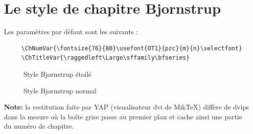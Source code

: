 \documentclass{report}
\begin{document}
    \section{Le style de chapitre Bjornstrup}
    Les paramètres par défaut sont les suivants :
    {\small\begin{verbatim}
     \ChNumVar{\fontsize{76}{80}\usefont{OT1}{pzc}{m}{n}\selectfont}
     \ChTitleVar{\raggedleft\Large\sffamily\bfseries}
    \end{verbatim}}
    \begin{figure}[h]
      \begin{minipage}{7 cm}
        \centerline{\color{gray!25}} 
        \caption{Style Bjornstrup \og étoilé \fg{}}
      \end{minipage}\hfill
      \begin{minipage}{7 cm}
        \centerline{\color{gray!25}}
        \caption{Style Bjornstrup \og normal \fg{}}
      \end{minipage}\hfill
    \end{figure}
    \textbf{Note:} la restitution faite par YAP (visualisateur dvi de MikTeX)
    diffère de dvips dans la mesure où la boîte grise passe au premier plan et
    cache ainsi une partie du numéro de chapitre. 
    \enlargethispage{2cm}
\end{document}
